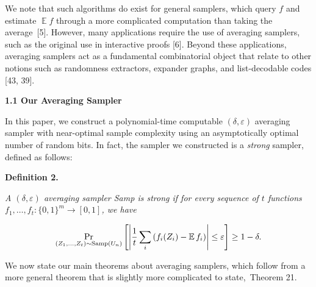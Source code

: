 \documentclass[10pt,a4paper]{article}
\begin{document}



We note that such algorithms do exist for general samplers, which query $f$ and estimate $\operatorname*{\mathbb{E}}f$ through a more complicated computation than taking the average [5].
However, many applications require the use of averaging samplers, such as the original use in interactive proofs [6].
Beyond these applications, averaging samplers act as a fundamental combinatorial object that relate to other notions such as randomness extractors, expander graphs, and list-decodable codes [43, 39].\par




\par\medskip\noindent\textbf{
1.1 Our Averaging Sampler}\par




In this paper, we construct a polynomial-time computable $(\delta,\varepsilon)$ averaging sampler with near-optimal sample complexity using an asymptotically optimal number of random bits. In fact, the sampler we constructed is a \emph{strong} sampler, defined as follows:\par





\par\medskip\noindent\textbf{
\textbf{Definition 2}\textbf{.}
}\par



\emph{A $(\delta,\varepsilon)$ averaging sampler Samp is strong if
for every sequence of $t$ functions $f_{1},\dots,f_{t}:\{0,1\}^{m}\to[0,1]$, we have}\par


\[\begin{gathered}
\Pr_{(Z_{1},\dots,Z_{t})\sim\textup{{Samp}}(U_{n})}\left[\left|\frac{1}{t}\sum_{i}\left(f_{i}(Z_{i})-\operatorname*{\mathbb{E}}f_{i}\right)\right|\leq\varepsilon\right]\geq 1-\delta.
\end{gathered}\]






We now state our main theorems about averaging samplers, which follow from a more general theorem that is slightly more complicated to state, Theorem 21.\par
\end{document}
